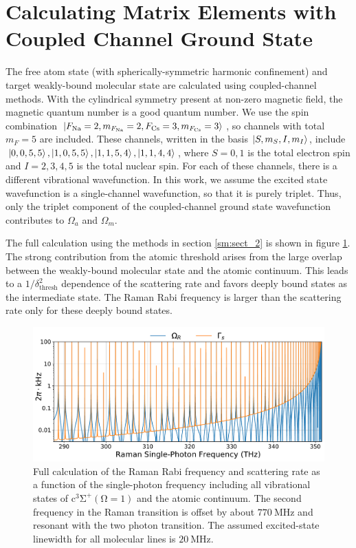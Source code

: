 \documentclass[aps,secnumarabic,amsmath,amssymb,superscriptaddress]{revtex4}
\begin{document}
\section{Calculating Matrix Elements with Coupled Channel Ground State}
The free atom state (with spherically-symmetric harmonic confinement) and target weakly-bound molecular state are calculated using coupled-channel methods. With the cylindrical symmetry present at non-zero magnetic field, the magnetic quantum number is a good quantum number. We use the spin combination $ \ket{F_{\text{Na}} = 2, m_{F_{\text{Na}}} = 2, F_{\text{Cs}} = 3, m_{F_{\text{Cs}}} = 3}$, so channels with total $ m_F = 5 $ are included. These channels, written in the basis $ \ket{S, m_S, I, m_I}$, include $ \ket{0,0,5,5}, \ket{1,0,5,5}, \ket{1,1,5,4}, \ket{1,1,4,4} $, where $S = 0,1$ is the total electron spin and $ I = 2,3,4,5 $ is the total nuclear spin. For each of these channels, there is a different vibrational wavefunction. In this work, we assume the excited state wavefunction is a single-channel wavefunction, so that it is purely triplet. Thus, only the triplet component of the coupled-channel ground state wavefunction contributes to $\Omega_a$ and $ \Omega_m $.

The full calculation using the methods in section \ref{sm:sect_2} is shown in figure \ref{f-sm}. The strong contribution from the atomic threshold arises from the large overlap between the weakly-bound molecular state and the atomic continuum. This leads to a $1/\delta_{\text{thresh}}^2$ dependence of the scattering rate and favors deeply bound states as the intermediate state. The Raman Rabi frequency is larger than the scattering rate only for these deeply bound states.

\begin{figure}[ht!]
  \includegraphics[width=\textwidth]{imgs/raman_theory_full.pdf}
  \caption{ Full calculation of the Raman Rabi frequency and scattering rate as a function of the single-photon frequency including all vibrational states of $ \mathrm{c^3\Sigma^+(\Omega = 1)}$ and the atomic continuum. The second frequency in the Raman transition is offset by about $770~\mathrm{MHz}$ and resonant with the two photon transition. The assumed excited-state linewidth for all molecular lines is $20~\text{MHz} $.
    \label{f-sm}}
\end{figure}
\end{document}
